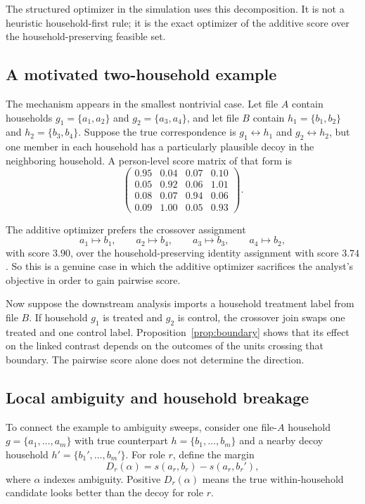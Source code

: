 \documentclass[11pt]{article}
\theoremstyle{remark}
\begin{document}
The structured optimizer in the simulation uses this decomposition. It is not a heuristic household-first rule; it is the exact optimizer of the additive score over the household-preserving feasible set.

\subsection{A motivated two-household example}

The mechanism appears in the smallest nontrivial case. Let file $A$ contain households $g_1=\{a_1,a_2\}$ and $g_2=\{a_3,a_4\}$, and let file $B$ contain $h_1=\{b_1,b_2\}$ and $h_2=\{b_3,b_4\}$. Suppose the true correspondence is $g_1\leftrightarrow h_1$ and $g_2\leftrightarrow h_2$, but one member in each household has a particularly plausible decoy in the neighboring household. A person-level score matrix of that form is
\begin{equation}
\label{eq:toy-matrix-household}
\begin{pmatrix}
0.95 & 0.04 & 0.07 & 0.10 \\
0.05 & 0.92 & 0.06 & 1.01 \\
0.08 & 0.07 & 0.94 & 0.06 \\
0.09 & 1.00 & 0.05 & 0.93
\end{pmatrix}.
\end{equation}

The additive optimizer prefers the crossover assignment
\[
a_1\mapsto b_1,
\qquad
a_2\mapsto b_4,
\qquad
a_3\mapsto b_3,
\qquad
a_4\mapsto b_2,
\]
with score $3.90$, over the household-preserving identity assignment with score $3.74$. So this is a genuine case in which the additive optimizer sacrifices the analyst's objective in order to gain pairwise score.

Now suppose the downstream analysis imports a household treatment label from file $B$. If household $g_1$ is treated and $g_2$ is control, the crossover join swaps one treated and one control label. Proposition~\ref{prop:boundary} shows that its effect on the linked contrast depends on the outcomes of the units crossing that boundary. The pairwise score alone does not determine the direction.

\subsection{Local ambiguity and household breakage}

To connect the example to ambiguity sweeps, consider one file-$A$ household $g=\{a_1,\dots,a_m\}$ with true counterpart $h=\{b_1,\dots,b_m\}$ and a nearby decoy household $h'=\{b_1',\dots,b_m'\}$. For role $r$, define the margin
\begin{equation}
D_r(\alpha)=s(a_r,b_r)-s(a_r,b_r'),
\label{eq:role-margin-household}
\end{equation}
where $\alpha$ indexes ambiguity. Positive $D_r(\alpha)$ means the true within-household candidate looks better than the decoy for role $r$.
\end{document}
